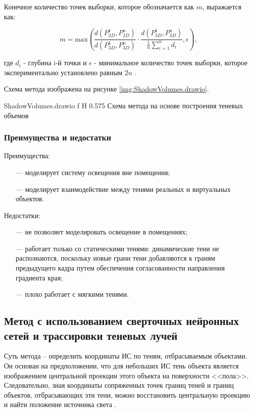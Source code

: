 Конечное количество точек выборки, которое обозначается как $m$, выражается как:

\begin{equation}
	m = \text{max}(\frac{d(P_{2D}^1, P_{2D}^n)}{d(P_{3D}^1, P_{3D}^n)} \cdot \frac{d(P_{3D}^1, P_{3D}^n)}{\frac{1}{n} \sum_{i=1}^{n} d_i}, \epsilon),
\end{equation}

где $d_i$ - глубина i-й точки и $\epsilon$ - минимальное количество точек выборки, которое экспериментально установлено равным $2n$ \cite{wei2019simulating}.

Схема метода изображена на рисунке \ref{img:ShadowVolumes.drawio}.

{ShadowVolumes.drawio}
{f}
{H}
{0.575\textwidth}
{Схема метода на основе построения теневых объемов}

\subsubsection*{Преимущества и недостатки}

Преимущества:
\begin{itemize}
	\item[---] моделирует систему освещения вне помещения;
	\item[---] моделирует взаимодействие между тенями реальных и виртуальных объектов.
\end{itemize}

Недостатки:
\begin{itemize}
	\item[---] не позволяет моделировать освещение в помещениях;
	\item[---] работает только со статическими тенями: динамические тени не распознаются, поскольку новые грани тени добавляются к граням предыдущего кадра путем обеспечения согласованности направления градиента края;
	\item[---] плохо работает с мягкими тенями.
\end{itemize}

\subsection{Метод с использованием сверточных нейронных сетей и трассировки теневых лучей}

Суть метода -- определить координаты ИС по теням, отбрасываемым объектами. Он основан на предположении, что для небольших ИС тень объекта является изображением центральной проекции этого объекта на поверхности <<пола>>. Следовательно, зная координаты сопряженных точек границ теней и границ объектов, отбрасывающих эти тени, можно восстановить центральную проекцию и найти положение источника света \cite{sns_tras}.

